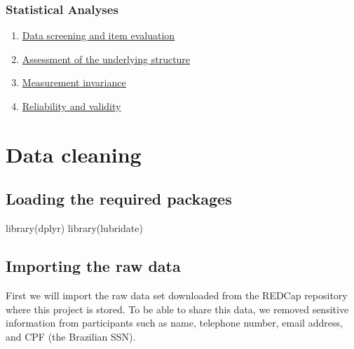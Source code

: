 \documentclass[
  letterpaper,
  DIV=11,
  numbers=noendperiod]{scrreprt}
\newenvironment{Shaded}{\begin{snugshade}}{\end{snugshade}}
\newcommand{\FunctionTok}[1]{\textcolor[rgb]{0.28,0.35,0.67}{#1}}
\newcommand{\NormalTok}[1]{\textcolor[rgb]{0.00,0.23,0.31}{#1}}
\providecommand{\tightlist}{%
  \setlength{\itemsep}{0pt}\setlength{\parskip}{0pt}}\usepackage{longtable,booktabs,array}
\begin{document}
\hypertarget{statistical-analyses}{%
\subsection{Statistical Analyses}\label{statistical-analyses}}

\begin{enumerate}
\def\labelenumi{\arabic{enumi}.}
\tightlist
\item
  \protect\hyperlink{data-screening}{Data screening and item evaluation}
\item
  \protect\hyperlink{dimensionality-analyses}{Assessment of the
  underlying structure}
\item
  \protect\hyperlink{invariance}{Measurement invariance}
\item
  \protect\hyperlink{reliability-and-validity}{Reliability and validity}
\end{enumerate}


\hypertarget{data-cleaning}{%
\chapter{Data cleaning}\label{data-cleaning}}

\hypertarget{loading-the-required-packages}{%
\section{Loading the required
packages}\label{loading-the-required-packages}}

\begin{Shaded}
\begin{Highlighting}[]
\FunctionTok{library}\NormalTok{(dplyr)}
\FunctionTok{library}\NormalTok{(lubridate)}
\end{Highlighting}
\end{Shaded}

\hypertarget{importing-the-raw-data}{%
\section{Importing the raw data}\label{importing-the-raw-data}}

First we will import the raw data set downloaded from the REDCap
repository where this project is stored. To be able to share this data,
we removed sensitive information from participants such as name,
telephone number, email address, and CPF (the Brazilian SSN).
\end{document}
